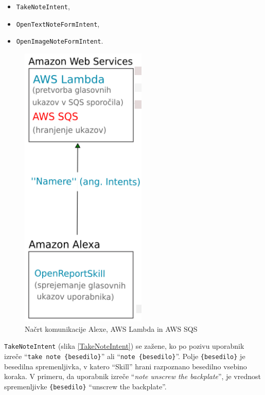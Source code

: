 \documentclass[a4paper, 12pt]{book}
\begin{document}
\begin{itemize}
	\item \texttt{TakeNoteIntent},
	\item \texttt{OpenTextNoteFormIntent},
	\item \texttt{OpenImageNoteFormIntent}.
\end{itemize}

\begin{figure}[H]
\begin{center}
\includegraphics[width=6cm]{plan_alexa_sqs}
\end{center}
\caption{Načrt komunikacije Alexe, AWS Lambda in AWS SQS}
\label{plan_alexa_sqs}
\end{figure}

\texttt{TakeNoteIntent} (slika \ref{TakeNoteIntent}) se zažene, ko po pozivu uporabnik izreče \enquote{\texttt{take note \{besedilo\}}} ali \enquote{\texttt{note \{besedilo\}}}.
Polje \texttt{\{besedilo\}} je besedilna spremenljivka, v katero \enquote{Skill} hrani razpoznano besedilno vsebino koraka.
V primeru, da uporabnik izreče \enquote{\textit{note unscrew the backplate}}, je vrednost spremenljivke \texttt{\{besedilo\}} \enquote{unscrew the backplate}.
\end{document}
